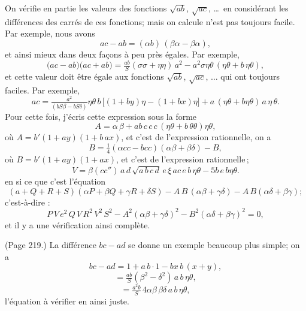 \documentclass[11pt,a4paper]{book}
\begin{document}
On v\'erifie en partie les valeurs des fonctions $\sqrt{ab}$, $\sqrt{ac}$, \ldots\ en consid\'erant les diff\'erences des carr\'es de ces fonctions; mais on calcule n'est pas toujours facile. Par exemple, nous avons
\[
ac - ab = (\alpha b)\,(\beta\alpha - \beta\alpha),
\]
et ainsi mieux dans deux fa\c{c}ons \`a peu pr\`es \'egales. Par exemple,
\[
\big(ac - ab\big)\big(ac + ab\big) = \tfrac{a b}{S} (\sigma\sigma + \eta\eta)\,a^2 - a^2 \sigma\eta\theta\,(\eta\theta + b\,\eta\theta),
\]
et cette valeur doit \^etre \'egale aux fonctions $\sqrt{a b}$, $\sqrt{a c}$, $\ldots$ qui ont toujours faciles. Par exemple,
\[
ac = \tfrac{a^2}{(b S\beta - b S\delta)}\eta\theta\,b\,\big[(1 + by)\eta - (1 + bx)\eta\big] + a\,(\eta\theta + b\eta\theta)\,a\,\eta\,\theta.
\]
Pour cette fois, j'\'ecris cette expression sous la forme
\[
A = \alpha\,\beta + ab\,c\,c\,c\,(\eta\theta + b\,\theta\theta)\eta\theta,
\]
o\`u $A = b'(1 + a y)(1 + b\,a x)$, et c'est de l'expression rationnelle, on a
\[
B = \tfrac{1}{4} (\alpha c c - b c c)(\alpha\beta + \beta\delta) - B,
\]
o\`u $B = b'(1 + a y)(1 + a x)$, et c'est de l'expression rationnelle\,;
\[
V = \beta(c c'')\,a\,d\,\sqrt{a\,b\,c\,d}\,e\,\xi\,a c\,e\,b\,\eta\theta - 5 b\,e\,b\eta\theta.
\]
en si ce que c'est l'\'equation
\[
(a + Q + R + S)(\alpha P + \beta Q + \gamma R + \delta S) - A\,B\,(\alpha\beta + \gamma\delta) - A\,B (\alpha\delta + \beta\gamma);
\]
c'est-\`a-dire :
\[
P\,V\,e^2\,Q\,V\,R^2\,V^2\,S^2 - A^2(\alpha\beta + \gamma\delta)^2 - B^2(\alpha\delta + \beta\gamma)^2 = 0,
\]
et il y a une v\'erification ainsi compl\`ete.

\medskip

\noindent (Page 219.) La diff\'erence $bc - ad$ se donne un exemple beaucoup plus simple; on a
\[
bc - ad = 1 + a\,b \cdot 1 - bx\,b\,(x + y),
\]
\[
= \tfrac{a b}{S} (\beta^2 - \delta^2)\,a\,b\,\eta\theta,
\]
\[
= \tfrac{a^2 b}{S}\,4 \alpha\beta\,\beta\delta\,a\,b\,\eta\theta,
\]
l'\'equation \`a v\'erifier en ainsi juste.

\medskip
\end{document}
